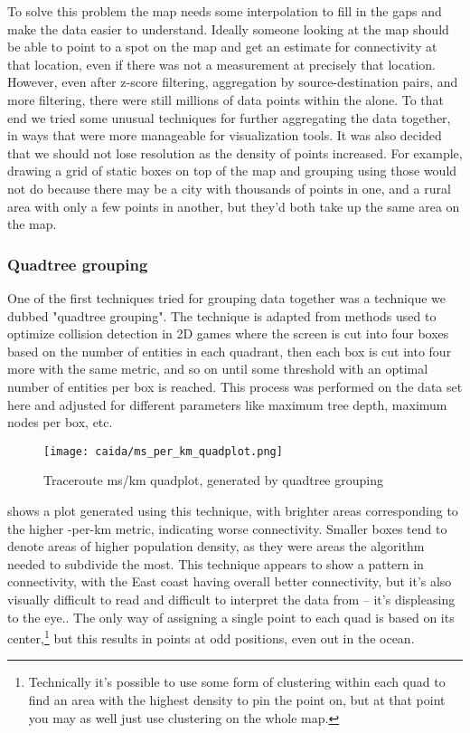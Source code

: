 To solve this problem the map needs some interpolation to fill in the gaps and make the data easier to understand. Ideally someone looking at the map should be able to point to a spot on the map and get an estimate for connectivity at that location, even if there was not a measurement at precisely that location. However, even after z-score filtering, aggregation by source-destination pairs, and more filtering, there were still millions of data points within the \us alone. To that end we tried some unusual techniques for further aggregating the data together, in ways that were more manageable for visualization tools. It was also decided that we should not lose resolution as the density of points increased. For example, drawing a grid of static boxes on top of the map and grouping using those would not do because there may be a city with thousands of points in one, and a rural area with only a few points in another, but they'd both take up the same area on the map.

\subsubsection{Quadtree grouping} One of the first techniques tried for grouping data together was a technique we dubbed "quadtree grouping". The technique is adapted from methods used to optimize collision detection in 2D games where the screen is cut into four boxes based on the number of entities in each quadrant, then each box is cut into four more with the same metric, and so on until some threshold with an optimal number of entities per box is reached. This process was performed on the data set here and adjusted for different parameters like maximum tree depth, maximum nodes per box, etc.

\begin{figure}[htb]
    \centering
    \texttt{[image: caida/ms\_per\_km\_quadplot.png]}
    \caption{Traceroute ms/km quadplot, generated by quadtree grouping}
    \label{fig:quadtree_grouping}
\end{figure}

 shows a plot generated using this technique, with brighter areas corresponding to the higher \rtt-per-km metric, indicating worse connectivity. Smaller boxes tend to denote areas of higher population density, as they were areas the algorithm needed to subdivide the most. This technique appears to show a pattern in connectivity, with the East coast having overall better connectivity, but it's also visually difficult to read and difficult to interpret the data from -- it's displeasing to the eye.. The only way of assigning a single point to each quad is based on its center,\footnote{Technically it's possible to use some form of clustering within each quad to find an area with the highest density to pin the point on, but at that point you may as well just use clustering on the whole map.} but this results in points at odd positions, even out in the ocean.

